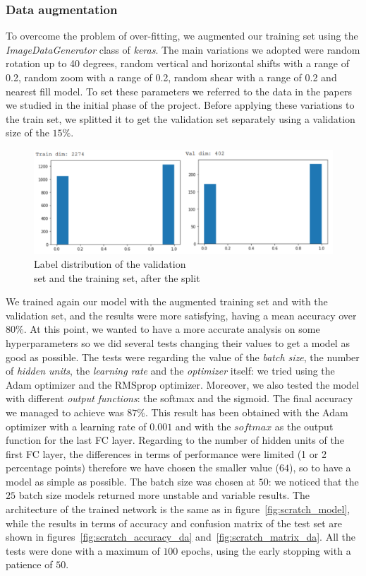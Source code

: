 \documentclass[11pt,a4paper,oneside]{article}
\begin{document}
\clearpage
\subsubsection{Data augmentation}
To overcome the problem of over-fitting, we augmented our training set using the \textit{ImageDataGenerator} class of \textit{keras}. The main variations we adopted were random rotation up to 40 degrees, random vertical and horizontal shifts with a range of 0.2, random zoom with a range of 0.2, random shear with a range of 0.2 and nearest fill model. To set these parameters we referred to the data in the papers we studied in the initial phase of the project. Before applying these variations to the train set, we splitted it to get the validation set separately using a validation size of the $15\%$.

\begin{figure}[h]
\centering
\includegraphics[width=.7\textwidth]{images/val_label_distribution}
\caption{Label distribution of the validation \\set and the training set, after the split}
\label{fig:val_label}
\end{figure}

We trained again our model with the augmented training set and with the validation set, and the results were more satisfying, having a mean accuracy over $80\%$. At this point, we wanted to have a more accurate analysis on some hyperparameters so we did several tests changing their values to get a model as good as possible. 
The tests were regarding the value of the \textit{batch size}, the number of \textit{hidden units}, the \textit{learning rate} and the \textit{optimizer} itself: we tried using the Adam optimizer and the RMSprop optimizer. Moreover, we also tested the model with different \textit{output functions}: the softmax and the sigmoid. 
The final accuracy we managed to achieve was $87\%$. This result has been obtained with the   Adam optimizer with a learning rate of $0.001$ and with the $softmax$ as the output function for the last FC layer. Regarding to the number of hidden units of the first FC layer, the differences in terms of performance were limited (1 or 2 percentage points) therefore we have chosen the smaller value ($64$), so to have a model as simple as possible. The batch size was chosen at $50$: we noticed that the $25$ batch size models returned more unstable and variable results. The architecture of the trained network is the same as in figure~\ref{fig:scratch_model}, while the results in terms of accuracy and confusion matrix of the test set are shown in figures~\ref{fig:scratch_accuracy_da} and~\ref{fig:scratch_matrix_da}.
All the tests were done with a maximum of $100$ epochs, using the early stopping with a patience of $50$.
\end{document}
